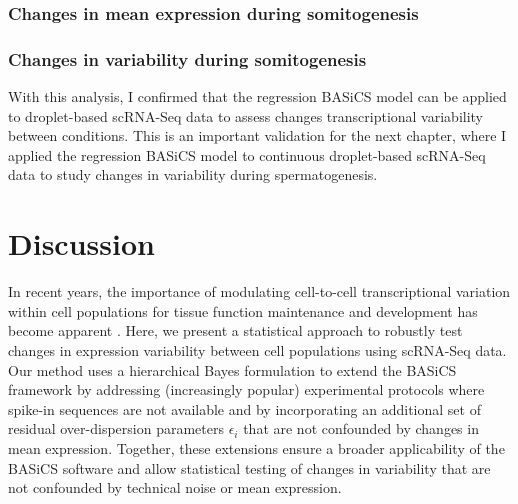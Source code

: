 \subsubsection{Changes in mean expression during somitogenesis}

\subsubsection{Changes in variability during somitogenesis}


With this analysis, I confirmed that the regression BASiCS model can be applied to droplet-based scRNA-Seq data to assess changes transcriptional variability between conditions. This is an important validation for the next chapter, where I applied the regression BASiCS model to continuous droplet-based scRNA-Seq data to study changes in variability during spermatogenesis. 
\section{Discussion}

In recent years, the importance of modulating cell-to-cell transcriptional variation within cell populations for tissue function maintenance and development has become apparent \citep{BaharHalpern2015, Mojtahedi2016, Goolam2016}. Here, we present a statistical approach to robustly test changes in expression variability between cell populations using scRNA-Seq data. Our method uses a hierarchical Bayes formulation to extend the BASiCS framework by addressing (increasingly popular) experimental protocols where spike-in sequences are not available and by incorporating an additional set of residual over-dispersion parameters $\epsilon_i$ that are not confounded by changes in mean expression. Together, these extensions ensure a broader applicability of the BASiCS software and allow statistical testing of changes in variability that are not confounded by technical noise or mean expression.  \\ 

